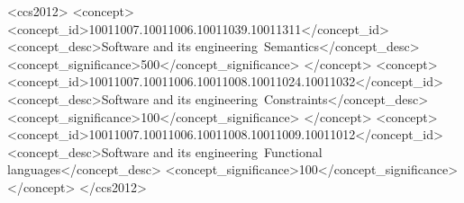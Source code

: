 \usepackage{mathpartir}
\usepackage{pifont}
\usepackage{tikz}
\usetikzlibrary{shapes}
\usetikzlibrary{positioning}

\usepackage[style=acmnumeric,backend=biber,natbib=true,datamodel=software]{biblatex}
\usepackage{software-biblatex}


\renewcommand{\preDoc}{}


\begin{CCSXML}
<ccs2012>
<concept>
<concept_id>10011007.10011006.10011039.10011311</concept_id>
<concept_desc>Software and its engineering~Semantics</concept_desc>
<concept_significance>500</concept_significance>
</concept>
<concept>
<concept_id>10011007.10011006.10011008.10011024.10011032</concept_id>
<concept_desc>Software and its engineering~Constraints</concept_desc>
<concept_significance>100</concept_significance>
</concept>
<concept>
<concept_id>10011007.10011006.10011008.10011009.10011012</concept_id>
<concept_desc>Software and its engineering~Functional languages</concept_desc>
<concept_significance>100</concept_significance>
</concept>
</ccs2012>
\end{CCSXML}



